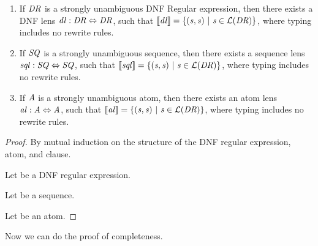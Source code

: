 \documentclass[numbers]{sigplanconf}
\begin{document}
\begin{lemma}
\leavevmode
\begin{enumerate}
\item If $\mathit{DR}$ is a strongly unambiguous DNF Regular expression, then
there exists a DNF lens $\mathit{dl} : \mathit{DR} \Leftrightarrow \mathit{DR}$,
such that $[ \! [\mathit{dl}] \! ]=
\{(\mathit{s},\mathit{s})~|~\mathit{s}\in\mathcal{L}(\mathit{DR})\}$, where
\DNFLens{} typing includes no rewrite rules.
\item If $\mathit{SQ}$ is a strongly unambiguous sequence, then
there exists a sequence lens $\mathit{sql} : \mathit{SQ} \Leftrightarrow \mathit{SQ}$,
such that $[ \! [\mathit{sql}] \! ]=
\{(\mathit{s},\mathit{s})~|~\mathit{s}\in\mathcal{L}(\mathit{DR})\}$, where
\SequenceLens{} typing includes no rewrite rules.
\item If $\mathit{A}$ is a strongly unambiguous atom, then
there exists an atom lens $\mathit{al} : \mathit{A} \Leftrightarrow \mathit{A}$,
such that $[ \! [\mathit{al}] \! ]=
\{(\mathit{s},\mathit{s})~|~\mathit{s}\in\mathcal{L}(\mathit{DR})\}$, where
\AtomLens{} typing includes no rewrite rules.
\end{enumerate}
\end{lemma}
\begin{proof}
By mutual induction on the structure of the DNF regular expression,
atom, and clause.

Let \DNFRegex{} be a DNF regular expression.

Let \Sequence{} be a sequence.

Let \Atom{} be an atom.
\end{proof}

Now we can do the proof of completeness.
\dnflc*
\end{document}
